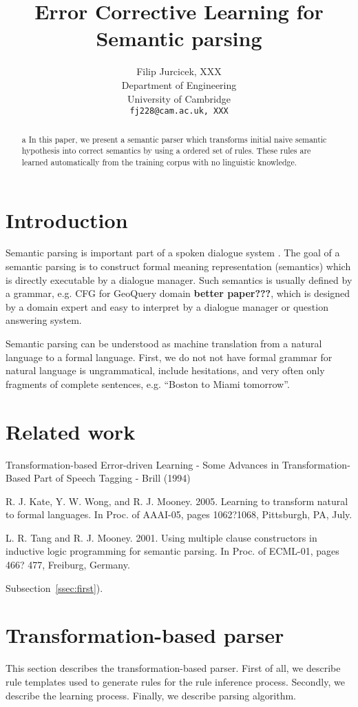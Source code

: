 \documentclass[11pt]{article}
\title{Error Corrective Learning for Semantic parsing}
\author{Filip Jurcicek, XXX \\
  Department of Engineering \\
  University of Cambridge \\
  {\tt fj228@cam.ac.uk, XXX}}
\date{}
\begin{document}
\maketitle
\begin{abstract}a
  In this paper, we present a semantic parser which transforms initial naive semantic hypothesis into correct semantics by using a ordered set of rules. These rules are learned automatically from the training corpus with no linguistic knowledge.
\end{abstract}

\section{Introduction}

Semantic parsing is important part of a spoken dialogue system \cite{williams07,thomson08}. The goal of a semantic parsing is to construct formal meaning representation (semantics) which is directly executable by a dialogue manager. Such semantics is usually defined by a grammar, e.g. CFG for GeoQuery domain \cite{wong06} \textbf{better paper???}, which is designed by a domain expert and easy to interpret by a dialogue manager or question answering system.

Semantic parsing can be understood as machine translation from a natural language to a formal language. First, we do not not have formal grammar for natural language is ungrammatical, include hesitations, and very often only fragments of complete sentences, e.g. ``Boston to Miami tomorrow''. 

\section{Related work}

Transformation-based Error-driven Learning - Some Advances in Transformation-Based Part of Speech Tagging - Brill (1994)

\cite{kate08} %


R. J. Kate, Y. W. Wong, and R. J. Mooney. 2005. Learning
to transform natural to formal languages. In Proc.
of AAAI-05, pages 1062?1068, Pittsburgh, PA, July.  

L. R. Tang and R. J. Mooney. 2001. Using multiple
clause constructors in inductive logic programming for
semantic parsing. In Proc. of ECML-01, pages 466?
477, Freiburg, Germany.

Subsection~\ref{ssec:first}).

\section{Transformation-based parser}
This section describes the transformation-based parser. First of all, we describe rule templates used to generate rules for the rule inference process. Secondly, we describe the learning process. Finally, we describe parsing algorithm.
\end{document}
